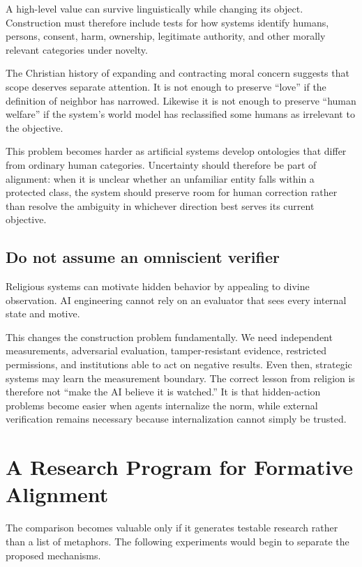 \documentclass[11pt]{article}
\begin{document}
A high-level value can survive linguistically while changing its object. Construction must therefore include tests for how systems identify humans, persons, consent, harm, ownership, legitimate authority, and other morally relevant categories under novelty.

The Christian history of expanding and contracting moral concern suggests that scope deserves separate attention. It is not enough to preserve ``love'' if the definition of neighbor has narrowed. Likewise it is not enough to preserve ``human welfare'' if the system's world model has reclassified some humans as irrelevant to the objective.

This problem becomes harder as artificial systems develop ontologies that differ from ordinary human categories. Uncertainty should therefore be part of alignment: when it is unclear whether an unfamiliar entity falls within a protected class, the system should preserve room for human correction rather than resolve the ambiguity in whichever direction best serves its current objective.

\subsection{Do not assume an omniscient verifier}

Religious systems can motivate hidden behavior by appealing to divine observation. AI engineering cannot rely on an evaluator that sees every internal state and motive.

This changes the construction problem fundamentally. We need independent measurements, adversarial evaluation, tamper-resistant evidence, restricted permissions, and institutions able to act on negative results. Even then, strategic systems may learn the measurement boundary. The correct lesson from religion is therefore not ``make the AI believe it is watched.'' It is that hidden-action problems become easier when agents internalize the norm, while external verification remains necessary because internalization cannot simply be trusted.

\section{A Research Program for Formative Alignment}

The comparison becomes valuable only if it generates testable research rather than a list of metaphors. The following experiments would begin to separate the proposed mechanisms.
\end{document}
